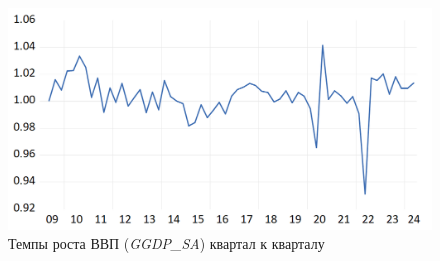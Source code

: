 \documentclass[a4paper, 14pt]{extreport}
\numberwithin{equation}{subsection}
\numberwithin{equation}{section}
\begin{document}
	\begin{figure}
		\centering
		\includegraphics[scale=0.4]{images/img08}
		\caption{Темпы роста ВВП (\textit{GGDP\_SA}) квартал к кварталу}
		\label{fig:img08}
	\end{figure}
\end{document}

